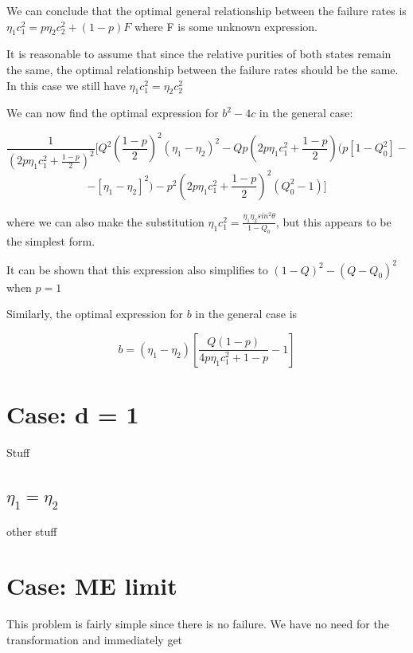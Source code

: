 \documentclass[12pt,oneside,english,reqno]{amsbook}
\numberwithin{section}{chapter}
\numberwithin{equation}{section}
\numberwithin{figure}{section}
\begin{document}
We can conclude that the optimal general relationship between the failure rates is $\eta_1 c_1^2 = p\eta_2 c_2^2 + (1-p)F$ where F is some unknown expression.

It is reasonable to assume that since the relative purities of both states remain the same, the optimal relationship between the failure rates should be the same.  In this case we still have $\eta_1 c_1^2 = \eta_2 c_2^2$ 

We can now find the optimal expression for $b^2-4c$ in the general case:

\[\frac{1}{(2p\eta_1c_1^2 +\frac{1-p}{2})^2}[Q^2(\frac{1-p}{2})^2(\eta_1-\eta_2)^2 - Qp(2p\eta_1c_1^2 +\frac{1-p}{2})(p[1-Q_0^2] - \]
 \[- [\eta_1 -\eta_2]^2) - p^2(2p\eta_1c_1^2 +\frac{1-p}{2})^2(Q_0^2-1)]\]

where we can also make the substitution $\eta_1 c_1^2 = \frac{\eta_1 \eta_2 sin^2\theta}{1-Q_0}$, but this appears to be the simplest form.  

It can be shown that this expression also simplifies to  $(1-Q)^2- (Q-Q_0)^2$ when $p=1$

Similarly, the optimal expression for $b$ in the general case is

\[b = (\eta_1 - \eta_2)[ \frac{Q(1-p)}{4p\eta_1 c_1^2 +1-p} -1]\]


\section{Case: d = 1}
Stuff

\subsection{$\eta_1 = \eta_2$}
other stuff


\section{Case: ME limit}
This problem is fairly simple since there is no failure.  We have no need for the transformation and immediately get
\end{document}
